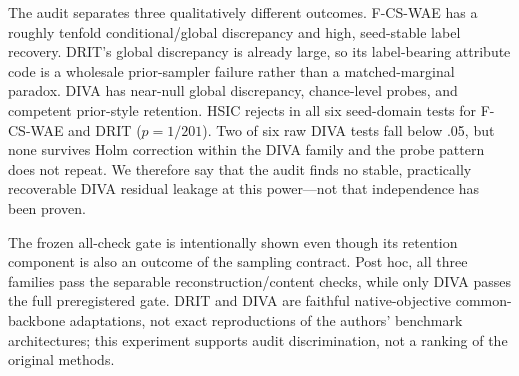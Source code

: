 \documentclass{article}
\begin{document}
\begin{table}[t]
\caption{Native cross-model audit, mean $\pm$ sample standard deviation over
three model seeds.  Probe and retention entries are percentages.  ``Base''
checks reconstruction and content representation; ``all'' additionally
includes the preregistered $70\%$ prior-style retention gate.}
\label{tab:cross-model}
\centering
\scriptsize
\setlength{\tabcolsep}{3.2pt}
\end{table}

The audit separates three qualitatively different outcomes.  F-CS-WAE has a
roughly tenfold conditional/global discrepancy and high, seed-stable label
recovery.  DRIT's global discrepancy is already large, so its label-bearing
attribute code is a wholesale prior-sampler failure rather than a
matched-marginal paradox.  DIVA has near-null global discrepancy, chance-level
probes, and competent prior-style retention.  HSIC rejects in all six
seed-domain tests for F-CS-WAE and DRIT ($p=1/201$).  Two of six raw DIVA tests
fall below .05, but none survives Holm correction within the DIVA family and
the probe pattern does not repeat.  We therefore say that the audit finds no
stable, practically recoverable DIVA residual leakage at this power---not that
independence has been proven.

The frozen all-check gate is intentionally shown even though its retention
component is also an outcome of the sampling contract.  Post hoc, all three
families pass the separable reconstruction/content checks, while only DIVA
passes the full preregistered gate.  DRIT and DIVA are faithful
native-objective common-backbone adaptations, not exact reproductions of the
authors' benchmark architectures; this experiment supports audit
discrimination, not a ranking of the original methods.
\end{document}
